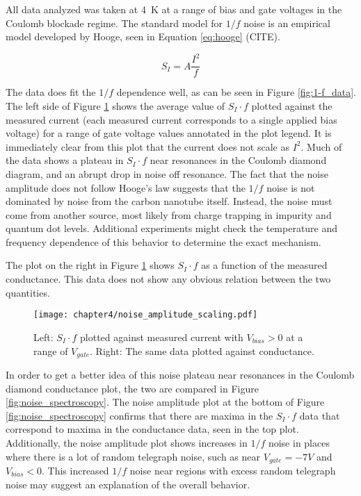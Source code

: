 All data analyzed was taken at \SI{4}{\kelvin} at a range of bias and gate voltages in the Coulomb blockade regime. The standard model for $1/f$ noise is an empirical model developed by Hooge, seen in Equation \ref{eq:hooge} (CITE).

\begin{equation}
    \label{eq:hooge}
    S_{I} = A\frac{I^2}{f}
\end{equation}

The data does fit the $1/f$ dependence well, as can be seen in Figure \ref{fig:1-f_data}. The left side of Figure \ref{fig:noise_current} shows the average value of $S_I \cdot f$ plotted against the measured current (each measured current corresponds to a single applied bias voltage) for a range of gate voltage values annotated in the plot legend. It is immediately clear from this plot that the current does not scale as $I^2$. Much of the data shows a plateau in $S_I \cdot f$ near resonances in the Coulomb diamond diagram, and an abrupt drop in noise off resonance. The fact that the noise amplitude does not follow Hooge's law suggests that the $1/f$ noise is not dominated by noise from the carbon nanotube itself. Instead, the noise must come from another source, most likely from charge trapping in impurity and quantum dot levels. Additional experiments might check the temperature and frequency dependence of this behavior to determine the exact mechanism.

The plot on the right in Figure \ref{fig:noise_current} shows $S_I \cdot f$ as a function of the measured conductance. This data does not show any obvious relation between the two quantities. 

\begin{figure}
    \centering
    \texttt{[image: chapter4/noise\_amplitude\_scaling.pdf]}
    \caption{Left: $S_I \cdot f$ plotted against measured current with $V_{bias}>0$ at a range of $V_{gate}$. Right: The same data plotted against conductance.}
    \label{fig:noise_current}
\end{figure}

In order to get a better idea of this noise plateau near resonances in the Coulomb diamond conductance plot, the two are compared in Figure \ref{fig:noise_spectroscopy}. The noise amplitude plot at the bottom of Figure \ref{fig:noise_spectroscopy} confirms that there are maxima in the $S_I \cdot f$ data that correspond to maxima in the conductance data, seen in the top plot. Additionally, the noise amplitude plot shows increases in $1/f$ noise in places where there is a lot of random telegraph noise, such as near $V_{gate} = -7V$ and $V_{bias}<0$. This increased $1/f$ noise near regions with excess random telegraph noise may suggest an explanation of the overall behavior. 

